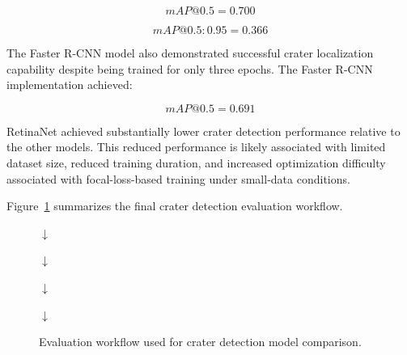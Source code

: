 \documentclass[conference]{IEEEtran}
\begin{document}
	\begin{equation}
		mAP@0.5 = 0.700
	\end{equation}
	
	\begin{equation}
		mAP@0.5:0.95 = 0.366
	\end{equation}
	
	The Faster R-CNN model also demonstrated successful crater localization capability despite being trained for only three epochs. The Faster R-CNN implementation achieved:
	
	\begin{equation}
		mAP@0.5 = 0.691
	\end{equation}
	
	RetinaNet achieved substantially lower crater detection performance relative to the other models. This reduced performance is likely associated with limited dataset size, reduced training duration, and increased optimization difficulty associated with focal-loss-based training under small-data conditions.
	
	Figure~\ref{fig:results_pipeline} summarizes the final crater detection evaluation workflow.
	
	\begin{figure}[h]
		\centering
		
		
		\vspace{0.15cm}
		
		$\downarrow$
		
		\vspace{0.15cm}
		
		
		\vspace{0.15cm}
		
		$\downarrow$
		
		\vspace{0.15cm}
		
		
		\vspace{0.15cm}
		
		$\downarrow$
		
		\vspace{0.15cm}
		
		
		\vspace{0.15cm}
		
		$\downarrow$
		
		\vspace{0.15cm}
		
		
		\caption{Evaluation workflow used for crater detection model comparison.}
		\label{fig:results_pipeline}
		
	\end{figure}
	
\end{document}
